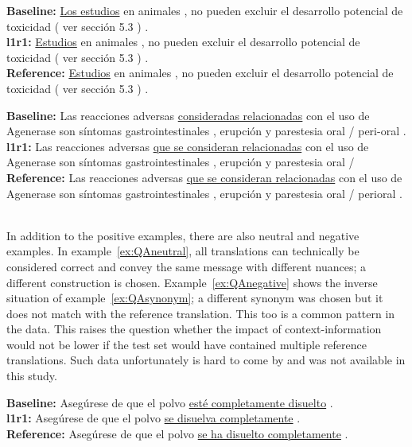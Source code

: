 \begin{exe}
\footnotesize
\ex \textbf{Baseline:} \underline{Los estudios} en animales , no pueden excluir el desarrollo potencial de toxicidad ( ver sección 5.3 ) . \\
\textbf{l1r1:} \underline{Estudios} en animales , no pueden excluir el desarrollo potencial de toxicidad ( ver sección 5.3 ) . \\
\textbf{Reference:} \underline{Estudios} en animales , no pueden excluir el desarrollo potencial de toxicidad ( ver sección 5.3 ) .
\label{ex:QAdrop}
\end{exe}

\begin{exe}
\footnotesize
\ex \textbf{Baseline:} Las reacciones adversas \underline{consideradas relacionadas} con el uso de Agenerase son síntomas gastrointestinales , erupción y parestesia oral / peri-oral . \\
\textbf{l1r1:}  Las reacciones adversas \underline{que se consideran relacionadas} con el uso de Agenerase son síntomas gastrointestinales , erupción y parestesia oral / \\
\textbf{Reference:} Las reacciones adversas \underline{que se consideran relacionadas} con el uso de Agenerase son síntomas gastrointestinales , erupción y parestesia oral / perioral . \\ \\
\label{ex:QAgrammar}
\end{exe}

In addition to the positive examples, there are also neutral and negative
examples. In example~\ref{ex:QAneutral}, all translations can technically be
considered correct and convey the same message with different nuances; a
different construction is chosen. Example~\ref{ex:QAnegative} shows the
inverse situation of example~\ref{ex:QAsynonym}; a different synonym was chosen
but it does not match with the reference translation. This too is a common
pattern in the data. This raises the question whether the impact of
context-information would not be lower if the test set would have contained
multiple reference translations. Such data unfortunately is hard to come by and
was not available in this study.

\begin{exe}
\footnotesize
\ex \textbf{Baseline:} Asegúrese de que el polvo \underline{esté completamente disuelto} . \\
\textbf{l1r1:} Asegúrese de que el polvo \underline{se disuelva completamente} .  \\
\textbf{Reference:} Asegúrese de que el polvo \underline{se ha disuelto completamente} .
\label{ex:QAneutral}
\end{exe}

